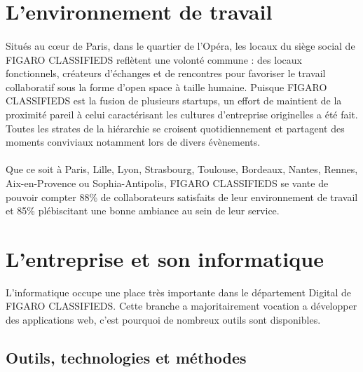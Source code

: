 \section{L'environnement de travail}
\paragraph{}
Situés au cœur de Paris, dans le quartier de l’Opéra, les locaux du siège social de FIGARO CLASSIFIEDS reflètent une volonté commune : des locaux fonctionnels, créateurs d’échanges et de rencontres pour favoriser le travail collaboratif sous la forme d'open space à taille humaine.
Puisque FIGARO CLASSIFIEDS est la fusion de plusieurs startups, un effort de maintient de la proximité pareil à celui caractérisant les cultures d'entreprise originelles a été fait.
Toutes les strates de la hiérarchie se croisent quotidiennement et partagent des moments conviviaux notamment lors de divers évènements.
\paragraph{}
Que ce soit à Paris, Lille, Lyon, Strasbourg, Toulouse, Bordeaux, Nantes, Rennes, Aix-en-Provence ou Sophia-Antipolis, FIGARO CLASSIFIEDS se vante de pouvoir compter 88\% de collaborateurs satisfaits de leur environnement de travail et 85\% plébiscitant une bonne ambiance au sein de leur service.

\section{L'entreprise et son informatique}
L'informatique occupe une place très importante dans le département Digital de FIGARO CLASSIFIEDS.
Cette branche a majoritairement vocation a développer des applications web, c'est pourquoi de nombreux outils sont disponibles.

\subsection{Outils, technologies et méthodes}
\label{subs:Outils, technologies et methodes}
